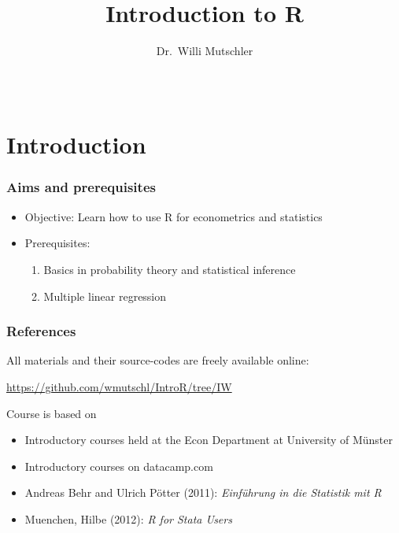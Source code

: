 \documentclass[xcolor={svgnames},10pt,
handout
]{beamer}
\begin{document}
\title[Introduction to R]{Introduction to R}
\author{Dr.\ Willi Mutschler }
\date{~}
\institute{}
\maketitle

\section{Introduction}

\begin{frame}
\frametitle{Aims and prerequisites}
\begin{itemize}
\item Objective: Learn how to use R for econometrics and statistics
\item Prerequisites:
\begin{enumerate}
\item Basics in probability theory and statistical inference
\item Multiple linear regression
\end{enumerate}
\end{itemize}
\end{frame}


\begin{frame}
\frametitle{References}
All materials and their source-codes are freely available online:
\begin{footnotesize}
\begin{description}
\item \url{https://github.com/wmutschl/IntroR/tree/IW}
\end{description}
\end{footnotesize}
Course is based on
\begin{itemize}
\item Introductory courses held at the Econ Department at University of Münster
\item Introductory courses on datacamp.com
\item Andreas Behr and Ulrich P\"{o}tter (2011): \emph{Einf\"{u}hrung in die Statistik mit R}
\item Muenchen, Hilbe (2012): \emph{R for Stata Users}
\end{itemize}
\end{frame}
\end{document}
